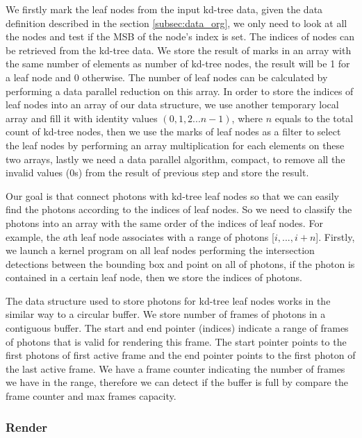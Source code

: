 We firstly mark the leaf nodes from the input kd-tree data, given the data definition described in the section \ref{subsec:data_org}, we only need to look at all the nodes and test if the MSB of the node's index is set. The indices of nodes can be retrieved from the kd-tree data. We store the result of marks in an array with the same number of elements as number of kd-tree nodes, the result will be 1 for a leaf node and 0 otherwise. The number of leaf nodes can be calculated by performing a data parallel reduction on this array. In order to store the indices of leaf nodes into an array of our data structure, we use another temporary local array and fill it with identity values \( (0, 1, 2 ... n-1) \), where \(n\) equals to the total count of kd-tree nodes, then we use the marks of leaf nodes as a filter to select the leaf nodes by performing an array multiplication for each elements on these two arrays, lastly we need a data parallel algorithm, compact, to remove all the invalid values (0s) from the result of previous step and store the result.

Our goal is that connect photons with kd-tree leaf nodes so that we can easily find the photons according to the indices of leaf nodes. So we need to classify the photons into an array with the same order of the indices of leaf nodes. For example, the \(a\)th leaf node associates with a range of photons [\(i, ..., i + n\)]. Firstly, we launch a kernel program on all leaf nodes performing the intersection detections between the bounding box and point on all of photons, if the photon is contained in a certain leaf node, then we store the indices of photons. 

The data structure used to store photons for kd-tree leaf nodes works in the similar way to a circular buffer. We store number of frames of photons in a contiguous buffer. The start and end pointer (indices) indicate a range of frames of photons that is valid for rendering this frame. The start pointer points to the first photons of first active frame and the end pointer points to the first photon of the last active frame. We have a frame counter indicating the number of frames we have in the range, therefore we can detect if the buffer is full by compare the frame counter and max frames capacity.


\subsubsection{Render}

